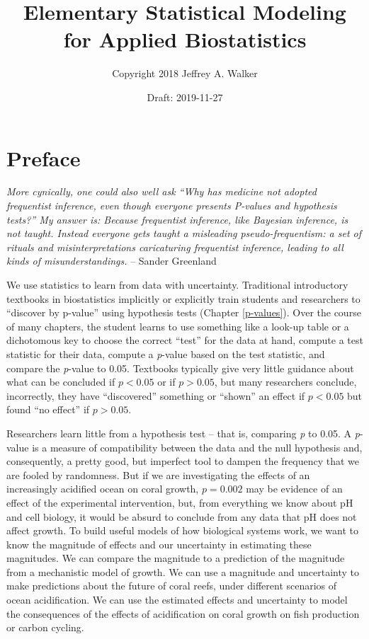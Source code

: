 \documentclass[]{book}
\title{Elementary Statistical Modeling for Applied Biostatistics}
\author{Copyright 2018 Jeffrey A. Walker}
\date{Draft: 2019-11-27}
\begin{document}
\maketitle

{
\setcounter{tocdepth}{1}
\tableofcontents
}
\chapter*{Preface}\label{preface}

\emph{More cynically, one could also well ask ``Why has medicine not
adopted frequentist inference, even though everyone presents P-values
and hypothesis tests?'' My answer is: Because frequentist inference,
like Bayesian inference, is not taught. Instead everyone gets taught a
misleading pseudo-frequentism: a set of rituals and misinterpretations
caricaturing frequentist inference, leading to all kinds of
misunderstandings.} -- Sander Greenland

We use statistics to learn from data with uncertainty. Traditional
introductory textbooks in biostatistics implicitly or explicitly train
students and researchers to ``discover by p-value'' using hypothesis
tests (Chapter \ref{p-values}). Over the course of many chapters, the
student learns to use something like a look-up table or a dichotomous
key to choose the correct ``test'' for the data at hand, compute a test
statistic for their data, compute a \emph{p}-value based on the test
statistic, and compare the \emph{p}-value to 0.05. Textbooks typically
give very little guidance about what can be concluded if \(p < 0.05\) or
if \(p > 0.05\), but many researchers conclude, incorrectly, they have
``discovered'' something or ``shown'' an effect if \(p < 0.05\) but
found ``no effect'' if \(p > 0.05\).

Researchers learn little from a hypothesis test -- that is, comparing
\emph{p} to 0.05. A \emph{p}-value is a measure of compatibility between
the data and the null hypothesis and, consequently, a pretty good, but
imperfect tool to dampen the frequency that we are fooled by randomness.
But if we are investigating the effects of an increasingly acidified
ocean on coral growth, \(p=0.002\) may be evidence of an effect of the
experimental intervention, but, from everything we know about pH and
cell biology, it would be absurd to conclude from any data that pH does
not affect growth. To build useful models of how biological systems
work, we want to know the magnitude of effects and our uncertainty in
estimating these magnitudes. We can compare the magnitude to a
prediction of the magnitude from a mechanistic model of growth. We can
use a magnitude and uncertainty to make predictions about the future of
coral reefs, under different scenarios of ocean acidification. We can
use the estimated effects and uncertainty to model the consequences of
the effects of acidification on coral growth on fish production or
carbon cycling.
\end{document}
